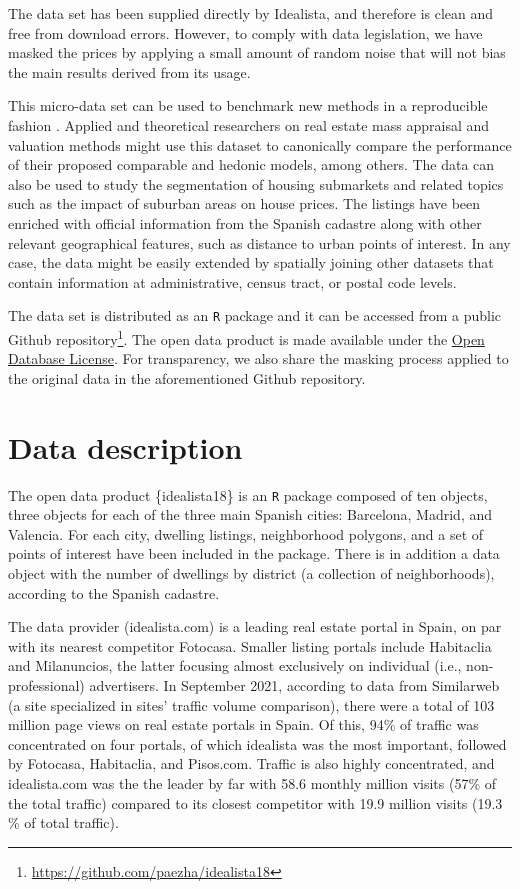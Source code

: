 \documentclass[Royal,times,sageh]{sagej}
\begin{document}
The data set has been supplied directly by Idealista, and therefore is
clean and free from download errors. However, to comply with data
legislation, we have masked the prices by applying a small amount of
random noise that will not bias the main results derived from its usage.

This micro-data set can be used to benchmark new methods in a
reproducible fashion \citep[e.g.,][]{rey2023using}. Applied and
theoretical researchers on real estate mass appraisal and valuation
methods might use this dataset to canonically compare the performance of
their proposed comparable and hedonic models, among others. The data can
also be used to study the segmentation of housing submarkets and related
topics such as the impact of suburban areas on house prices. The
listings have been enriched with official information from the Spanish
cadastre along with other relevant geographical features, such as
distance to urban points of interest. In any case, the data might be
easily extended by spatially joining other datasets that contain
information at administrative, census tract, or postal code levels.

The data set is distributed as an \texttt{R} package and it can be
accessed from a public Github
repository\footnote{\url{https://github.com/paezha/idealista18}}. The
open data product is made available under the
\href{http://opendatacommons.org/licenses/odbl/1.0/}{Open Database License}.
For transparency, we also share the masking process applied to the
original data in the aforementioned Github repository.

\hypertarget{data-description}{%
\section{Data description}\label{data-description}}

The open data product \{idealista18\} is an \texttt{R} package composed
of ten objects, three objects for each of the three main Spanish cities:
Barcelona, Madrid, and Valencia. For each city, dwelling listings,
neighborhood polygons, and a set of points of interest have been
included in the package. There is in addition a data object with the
number of dwellings by district (a collection of neighborhoods),
according to the Spanish cadastre.

The data provider (idealista.com) is a leading real estate portal in
Spain, on par with its nearest competitor Fotocasa. Smaller listing
portals include Habitaclia and Milanuncios, the latter focusing almost
exclusively on individual (i.e., non-professional) advertisers. In
September 2021, according to data from Similarweb (a site specialized in
sites' traffic volume comparison), there were a total of 103 million
page views on real estate portals in Spain. Of this, 94\% of traffic was
concentrated on four portals, of which idealista was the most important,
followed by Fotocasa, Habitaclia, and Pisos.com. Traffic is also highly
concentrated, and idealista.com was the the leader by far with 58.6
monthly million visits (57\% of the total traffic) compared to its
closest competitor with 19.9 million visits (19.3 \% of total traffic).
\end{document}
